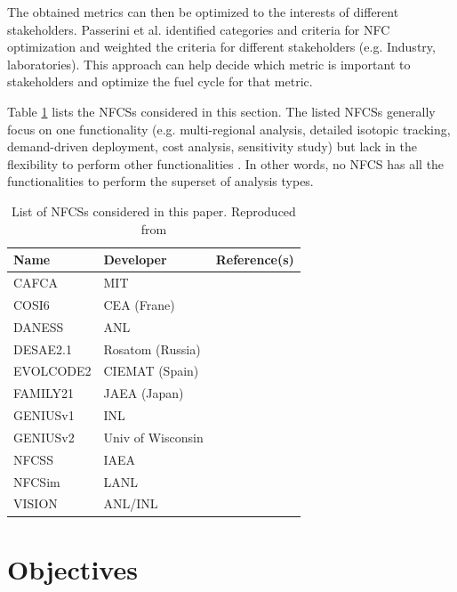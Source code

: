 The obtained metrics can then be optimized to the interests
of different stakeholders. Passerini et al. \cite{passerini_systematic_2014}
identified categories and criteria for \gls{NFC} optimization and
weighted the criteria for different stakeholders (e.g. Industry, laboratories).
This approach can help decide which metric is important to stakeholders
and optimize the fuel cycle for that metric.

Table \ref{tab:fcs} lists the \glspl{NFCS}
considered in this section. The listed \glspl{NFCS}
generally focus on one functionality
(e.g. multi-regional analysis, detailed isotopic tracking,
demand-driven deployment, cost analysis, sensitivity study)
but lack in the flexibility to perform other
functionalities \cite{huff_next_2010}. In
other words, no \gls{NFCS} has all the functionalities to
perform the superset of analysis types.

\begin{table}[h]
	\centering
	\caption{List of \glspl{NFCS} considered in this paper.
		Reproduced from \cite{huff_next_2010}}
	\label{tab:fcs}
	\begin{tabular}{lll}
		\hline
		Name & Developer & Reference(s) \\
		\hline
		CAFCA & MIT & \cite{guerin_benchmark_2009}\\
		COSI6 & CEA (Frane) & \cite{eschbach_new_2013} \\
		DANESS & ANL & \cite{van_den_durpel_daness:_2006}\\
		DESAE2.1 & Rosatom (Russia) & \cite{tsibulskiy_desae_2006}\\
		EVOLCODE2 & CIEMAT (Spain) & \cite{alvarez-velarde_validation_2014}\\
		FAMILY21 & JAEA (Japan) & \cite{oecd_nuclear_2009}\\
		GENIUSv1 & INL & \cite{dunzik-gougar_global_2007}\\
		GENIUSv2 & Univ of Wisconsin & \cite{dunn_genius_2009}\\
		NFCSS & IAEA & \cite{iaea_guidance_2008}\\
		NFCSim & LANL & \cite{schneider_nfcsim:_2005} \\
		VISION & ANL/INL & \cite{jacobson_verifiable_2010} \\
		\hline
	\end{tabular}
\end{table}


\section{Objectives}

